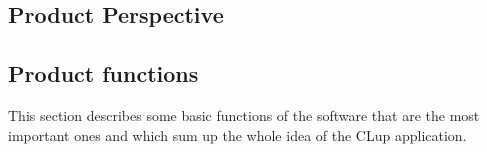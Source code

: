 \subsection{Product Perspective}







\subsection{Product functions}



This section describes some basic functions of the software that are the most important ones and which sum up the whole idea of the CLup application.

